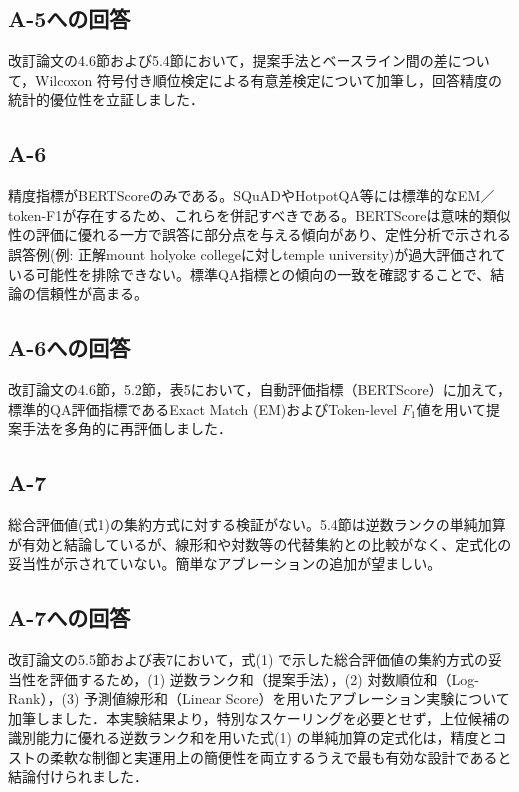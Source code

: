 \documentclass{jsarticle}
\begin{document}
\subsection*{A-5への回答}
改訂論文の4.6節および5.4節において，提案手法とベースライン間の差について，Wilcoxon 符号付き順位検定による有意差検定について加筆し，回答精度の統計的優位性を立証しました．

\subsection*{A-6}
\begin{screen}
精度指標がBERTScoreのみである。SQuADやHotpotQA等には標準的なEM／token-F1が存在するため、これらを併記すべきである。BERTScoreは意味的類似性の評価に優れる一方で誤答に部分点を与える傾向があり、定性分析で示される誤答例(例: 正解mount holyoke collegeに対しtemple university)が過大評価されている可能性を排除できない。標準QA指標との傾向の一致を確認することで、結論の信頼性が高まる。
\end{screen}

\subsection*{A-6への回答}
改訂論文の4.6節，5.2節，表5において，自動評価指標（BERTScore）に加えて，標準的QA評価指標であるExact Match (EM)およびToken-level $F_1$値を用いて提案手法を多角的に再評価しました．

\subsection*{A-7}
\begin{screen}
総合評価値(式1)の集約方式に対する検証がない。5.4節は逆数ランクの単純加算が有効と結論しているが、線形和や対数等の代替集約との比較がなく、定式化の妥当性が示されていない。簡単なアブレーションの追加が望ましい。
\end{screen}

\subsection*{A-7への回答}
改訂論文の5.5節および表7において，式(1) で示した総合評価値の集約方式の妥当性を評価するため，(1) 逆数ランク和（提案手法），(2) 対数順位和（Log-Rank），(3) 予測値線形和（Linear Score）を用いたアブレーション実験について加筆しました．本実験結果より，特別なスケーリングを必要とせず，上位候補の識別能力に優れる逆数ランク和を用いた式(1) の単純加算の定式化は，精度とコストの柔軟な制御と実運用上の簡便性を両立するうえで最も有効な設計であると結論付けられました．
\end{document}
